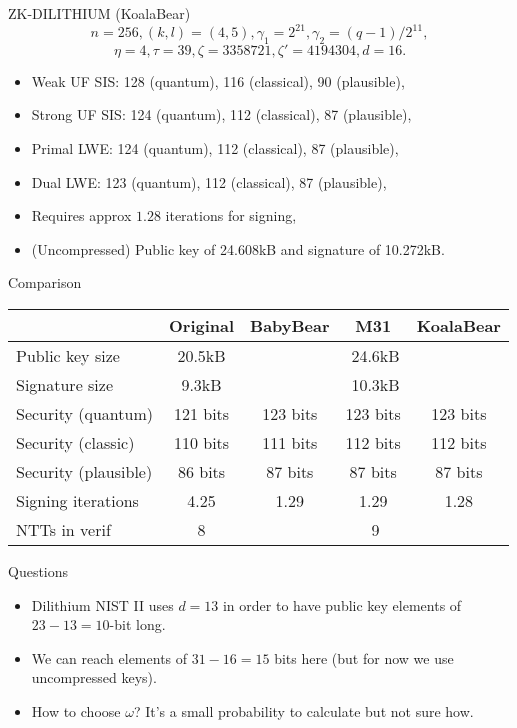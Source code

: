 \documentclass[aspectratio=169]{beamer}
\begin{document}
\begin{frame}{ZK-DILITHIUM (KoalaBear)} 
    $$n=256,  (k,l) = (4,5), \gamma_1 = 2^{21}, \gamma_2 = (q-1)/2^{11},$$
    $$\eta = 4, \tau = 39, \zeta = 3358721, \zeta'=4194304, d = 16.$$
    \begin{itemize}
        \item Weak UF SIS: 128 (quantum),   116 (classical), 90 (plausible),
        \item Strong UF SIS: 124 (quantum), 112 (classical), 87 (plausible),
        \item Primal LWE: 124 (quantum),    112 (classical), 87 (plausible),
        \item Dual LWE: 123 (quantum),      112 (classical), 87 (plausible),
        \item Requires approx $1.28$ iterations for signing,
        \item (Uncompressed) Public key of 24.608kB and signature of 10.272kB. 
    \end{itemize}
\end{frame}

\begin{frame}{Comparison}
    \begin{center}
        \begin{tabular}{|l|c|c|c|c|}
            \hline
            & \textbf{Original} & \textbf{BabyBear} & \textbf{M31} & \textbf{KoalaBear}\\
            \hline
            Public key size & 20.5kB & \multicolumn{3}{c|}{24.6kB}\\
            Signature size & 9.3kB & \multicolumn{3}{c|}{10.3kB}\\
            \hline
            Security (quantum) & 121 bits & 123 bits & 123 bits & 123 bits\\
            Security (classic) & 110 bits & 111 bits & 112 bits & 112 bits\\
            Security (plausible) & 86 bits & 87 bits & 87 bits  & 87 bits\\
            \hline
            Signing iterations & 4.25 & 1.29 & 1.29 & 1.28\\
            \hline
            NTTs in verif & 8 & \multicolumn{3}{c|}{9}\\
            \hline
        \end{tabular}
    \end{center}
\end{frame}

\begin{frame}{Questions}
    \begin{itemize}
        \item Dilithium NIST II uses $d=13$ in order to have public key elements of $23-13=10$-bit long.
        \item We can reach elements of $31 - 16 = 15$ bits here (but for now we use uncompressed keys).
        \item How to choose $\omega$? It's a small probability to calculate but not sure how.
    \end{itemize}
\end{frame}
    
\end{document}
